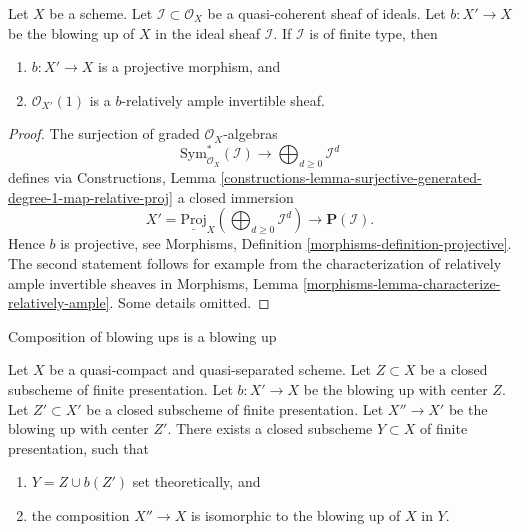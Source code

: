 \begin{lemma}
\label{lemma-blowing-up-projective}
Let $X$ be a scheme. Let $\mathcal{I} \subset \mathcal{O}_X$ be a
quasi-coherent sheaf of ideals. Let $b : X' \to X$ be the blowing up of $X$
in the ideal sheaf $\mathcal{I}$. If $\mathcal{I}$ is of finite type, then
\begin{enumerate}
\item $b : X' \to X$ is a projective morphism, and
\item $\mathcal{O}_{X'}(1)$ is a $b$-relatively ample invertible sheaf.
\end{enumerate}
\end{lemma}

\begin{proof}
The surjection of graded $\mathcal{O}_X$-algebras
$$
\text{Sym}_{\mathcal{O}_X}^*(\mathcal{I})
\longrightarrow
\bigoplus\nolimits_{d \geq 0} \mathcal{I}^d
$$
defines via Constructions, Lemma
\ref{constructions-lemma-surjective-generated-degree-1-map-relative-proj}
a closed immersion
$$
X' = \underline{\text{Proj}}_X (\bigoplus\nolimits_{d \geq 0} \mathcal{I}^d)
\longrightarrow
\mathbf{P}(\mathcal{I}).
$$
Hence $b$ is projective, see
Morphisms, Definition \ref{morphisms-definition-projective}.
The second statement follows for example from the characterization
of relatively ample invertible sheaves in
Morphisms, Lemma \ref{morphisms-lemma-characterize-relatively-ample}.
Some details omitted.
\end{proof}

\begin{lemma}
\label{lemma-composition-finite-type-blowups}
\begin{slogan}
Composition of blowing ups is a blowing up
\end{slogan}
Let $X$ be a quasi-compact and quasi-separated scheme.
Let $Z \subset X$ be a closed subscheme of finite presentation.
Let $b : X' \to X$ be the blowing up with center $Z$. Let $Z' \subset X'$ be
a closed subscheme of finite presentation.
Let $X'' \to X'$ be the blowing up with center $Z'$.
There exists a closed subscheme $Y \subset X$ of finite presentation,
such that
\begin{enumerate}
\item $Y = Z \cup b(Z')$ set theoretically, and
\item the composition $X'' \to X$ is isomorphic to the blowing up
of $X$ in $Y$.
\end{enumerate}
\end{lemma}

